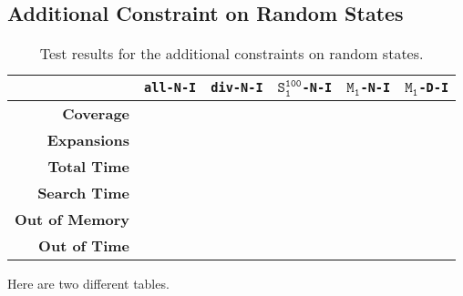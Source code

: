 \subsection{Additional Constraint on Random States}\label{subsec:additional-constraint-on-random-states}

\begin{table}[h!]
    \begin{center}
        \begin{tabular}{|r|c|c|c|c|c|}
            \hline
            & \textbf{\texttt{all-N-I}} & \textbf{\texttt{div-N-I}} & \textbf{$\texttt{S}_\texttt{1}^\texttt{100}$\texttt{-N-I}} & \textbf{$\texttt{M}_\texttt{1}$\texttt{-N-I}} & \textbf{$\texttt{M}_\texttt{1}$\texttt{-D-I}} \\
            \hline \hline
            \textbf{Coverage} &  &  &  &  &  \\ \hline
            \textbf{Expansions} &  &  &  &  &  \\ \hline
            \textbf{Total Time} &  &  &  &  &  \\ \hline
            \textbf{Search Time} &  &  &  &  &  \\ \hline
            \textbf{Out of Memory} &  &  &  &  &  \\ \hline
            \textbf{Out of Time} &  &  &  &  &  \\ \hline
        \end{tabular}
        \caption{Test results for the additional constraints on random states.}
        \label{table:random-samples-constraint}
    \end{center}
\end{table}

Here are two different tables. 

